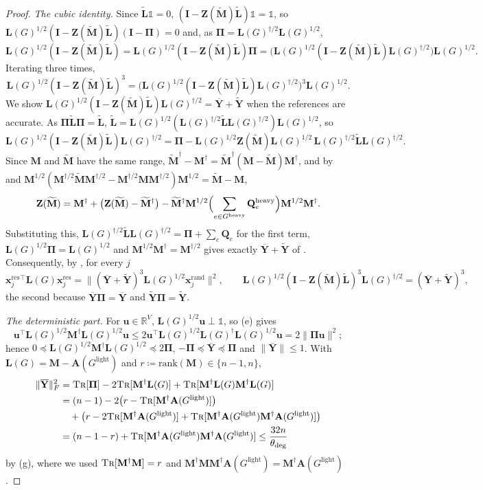 \documentclass[11pt]{article}
\theoremstyle{remark}
\renewcommand{\AA}{\mathbf A}
\newcommand{\II}{\mathbf I}
\newcommand{\LL}{\mathbf L}
\newcommand{\LLtil}{{\widetilde{\LL}}}
\newcommand{\MM}{\mathbf M}
\newcommand{\MMtil}{{\widetilde{\MM}}}
\newcommand{\PPi}{{\boldsymbol\Pi}}
\newcommand{\QQ}{\mathbf Q}
\newcommand{\uu}{\mathbf u}
\newcommand{\xx}{\mathbf x}
\newcommand{\xxrand}{\xx^{\mathrm{rand}}}
\newcommand{\xxres}{\xx^{\mathrm{res}}}
\newcommand{\YY}{\mathbf{Y}}
\newcommand{\YYbar}{{\overline{\YY}}}
\newcommand{\YYtil}{{\widetilde{\YY}}}
\newcommand{\ZZ}{\mathbf Z}
\newcommand{\dheavy}{\theta_{\deg}}
\newcommand{\Gh}{G^{\mathrm{heavy}}}
\newcommand{\Gl}{G^{\mathrm{light}}}
\newcommand{\R}{\mathbb R}
\newcommand{\defeq}{\coloneqq}
\newcommand{\norm}[1]{\lVert#1\rVert}
\newcommand{\oone}{\mathds{1}}
\newcommand{\tr}{\textsc{Tr}}
\begin{document}
\begin{proof}
\emph{The cubic identity.}
Since $\LLtil\oone=0$, $(\II-\ZZ(\MMtil)\LLtil)\oone=\oone$, so
$\LL(G)^{1/2}(\II-\ZZ(\MMtil)\LLtil)(\II-\PPi)=0$ and, as
$\PPi=\LL(G)^{\dag/2}\LL(G)^{1/2}$,
\[
\LL(G)^{1/2}(\II-\ZZ(\MMtil)\LLtil)
=\LL(G)^{1/2}(\II-\ZZ(\MMtil)\LLtil)\PPi
=\bigl(\LL(G)^{1/2}(\II-\ZZ(\MMtil)\LLtil)\LL(G)^{\dag/2}\bigr)\LL(G)^{1/2}.
\]
Iterating three times,
\begin{equation}\label{eq:iterate}
\LL(G)^{1/2}(\II-\ZZ(\MMtil)\LLtil)^{3}
=\bigl(\LL(G)^{1/2}(\II-\ZZ(\MMtil)\LLtil)\LL(G)^{\dag/2}\bigr)^{3}\LL(G)^{1/2}.
\end{equation}
We show $\LL(G)^{1/2}(\II-\ZZ(\MMtil)\LLtil)\LL(G)^{\dag/2}=\YYbar+\YYtil$
when the references are accurate.
As $\PPi\LLtil\PPi=\LLtil$, $\LLtil=\LL(G)^{1/2}(\LL(G)^{\dag/2}\LLtil\LL(G)^{\dag/2})\LL(G)^{1/2}$,
so
\[
\LL(G)^{1/2}(\II-\ZZ(\MMtil)\LLtil)\LL(G)^{\dag/2}
=\PPi-\LL(G)^{1/2}\ZZ(\MMtil)\LL(G)^{1/2}\,\LL(G)^{\dag/2}\LLtil\LL(G)^{\dag/2}.
\]
Since $\MM$ and $\MMtil$ have the same range,
$\MMtil^{\dag}-\MM^{\dag}=\MMtil^{\dag}(\MM-\MMtil)\MM^{\dag}$, and by
 and
$\MM^{1/2}(\MM^{\dag/2}\MMtil\MM^{\dag/2}-\MM^{\dag/2}\MM\MM^{\dag/2})\MM^{1/2}=\MMtil-\MM$,
\[
\ZZ(\MMtil)=\MM^{\dag}+\bigl(\ZZ(\MMtil)-\MMtil^{\dag}\bigr)
-\MMtil^{\dag}\MM^{1/2}\Bigl(\sum_{e\in\Gh}\QQ^{\mathrm{heavy}}_e\Bigr)\MM^{1/2}\MM^{\dag}.
\]
Substituting this, $\LL(G)^{\dag/2}\LLtil\LL(G)^{\dag/2}=\PPi+\sum_e\QQ_e$
for the first term, $\LL(G)^{1/2}\PPi=\LL(G)^{1/2}$ and
$\MM^{1/2}\MM^{\dag}=\MM^{\dag/2}$ gives exactly $\YYbar+\YYtil$ of
.
Consequently, by , for every $j$
\begin{equation}\label{eq:resenergy}
\xxres_j{}^{\top}\LL(G)\xxres_j=\norm{(\YYbar+\YYtil)^{3}\LL(G)^{1/2}\xxrand_j}^{2},
\qquad
\LL(G)^{1/2}(\II-\ZZ(\MMtil)\LLtil)^{3}\LL(G)^{\dag/2}=(\YYbar+\YYtil)^{3},
\end{equation}
the second because $\YYbar\PPi=\YYbar$ and $\YYtil\PPi=\YYtil$.

\emph{The deterministic part.}
For $\uu\in\R^{V}$, $\LL(G)^{1/2}\uu\perp\oone$, so (e) gives
\[
\uu^{\top}\LL(G)^{1/2}\MM^{\dag}\LL(G)^{1/2}\uu
\le2\uu^{\top}\LL(G)^{1/2}\LL(G)^{\dag}\LL(G)^{1/2}\uu=2\norm{\PPi\uu}^{2};
\]
hence $0\preceq\LL(G)^{1/2}\MM^{\dag}\LL(G)^{1/2}\preceq2\PPi$,
$-\PPi\preceq\YYbar\preceq\PPi$ and $\norm{\YYbar}\le1$.
With $\LL(G)=\MM-\AA(\Gl)$ and $r\defeq\mathrm{rank}(\MM)\in\{n-1,n\}$,
\begin{align*}
\norm{\YYbar}_F^{2}
&=\tr[\PPi]-2\tr[\MM^{\dag}\LL(G)]+\tr[\MM^{\dag}\LL(G)\MM^{\dag}\LL(G)]\\
&=(n-1)-2\bigl(r-\tr[\MM^{\dag}\AA(\Gl)]\bigr)\\
&\quad+\bigl(r-2\tr[\MM^{\dag}\AA(\Gl)]+\tr[\MM^{\dag}\AA(\Gl)\MM^{\dag}\AA(\Gl)]\bigr)\\
&=(n-1-r)+\tr[\MM^{\dag}\AA(\Gl)\MM^{\dag}\AA(\Gl)]
\le\frac{32n}{\dheavy}
\end{align*}
by (g), where we used
$\tr[\MM^{\dag}\MM]=r$ and $\MM^{\dag}\MM\MM^{\dag}\AA(\Gl)=\MM^{\dag}\AA(\Gl)$.


\end{proof}
\end{document}
